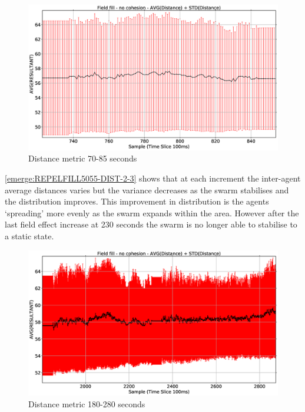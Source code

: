\begin{figure}[H]
\begin{center}
\includegraphics[width=12cm]{CHAPTER-8/figures/REPELFILL5055-DIST-1-2}
\end{center}
\caption{Distance metric 70-85 seconds\label{emerge:REPELFILL5055-DIST-1-2}}
\end{figure}

\autoref{emerge:REPELFILL5055-DIST-2-3} shows that at each increment the inter-agent average distances varies but the variance decreases as the swarm stabilises and the distribution improves. This improvement in distribution is the agents `spreading' more evenly as the swarm expands within the area. However after the last field effect increase at 230 seconds the swarm is no longer able to stabilise to a static state. 

\begin{figure}[H]
\begin{center}
\includegraphics[width=12cm]{CHAPTER-8/figures/REPELFILL5055-DIST-2-3}
\end{center}
\caption{Distance metric 180-280 seconds\label{emerge:REPELFILL5055-DIST-2-3}}
\end{figure}

